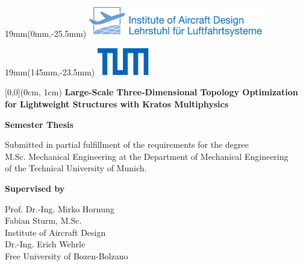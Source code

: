 \setlength{\parindent}{0pt}
\setlength{\parskip}{\baselineskip}
\TabPositions{4cm}
\pagestyle{empty}

\textblockorigin{20mm}{43.5mm} %

\begin{textblock*}{19mm}(0mm,-25.5mm)
\includegraphics[height = 14mm, keepaspectratio=true]{Abbildungen/LLS_Logo_deu_engl.pdf}
\end{textblock*}

\begin{textblock*}{19mm}(145mm,-23.5mm)
\includegraphics[height = 12mm, keepaspectratio=true]{Abbildungen/Universitaet_Logo_RGB.pdf}
\end{textblock*}

\begin{textblock*}{\textwidth}[0,0](0cm, 1cm)%
{\fontsize{24pt}{26pt}\selectfont\textbf{Large-Scale Three-Dimensional Topology
		Optimization for Lightweight Structures with Kratos Multiphysics}}

\vspace*{14pt}
{\fontsize{14pt}{22pt}\selectfont\textbf{Semester Thesis}}
\end{textblock*}
    
\vspace*{92.2mm}
\fontsize{15pt}{17.5pt}\selectfont%
Submitted in partial fulfillment of the requirements for the degree\\
M.Sc. Mechanical Engineering at the Department of Mechanical Engineering \\
of the Technical University of Munich.

\renewcommand{\baselinestretch}{1.47}
\normalsize\selectfont
\vspace*{10.1mm}
\textbf{Supervised by}\tab
\begin{minipage}[t]{\textwidth}
Prof. Dr.-Ing. Mirko Hornung\\
Fabian Sturm, M.Sc.\\
Institute of Aircraft Design
\\
Dr.-Ing. Erich Wehrle\\
Free University of Bozen-Bolzano\strut
\end{minipage}

